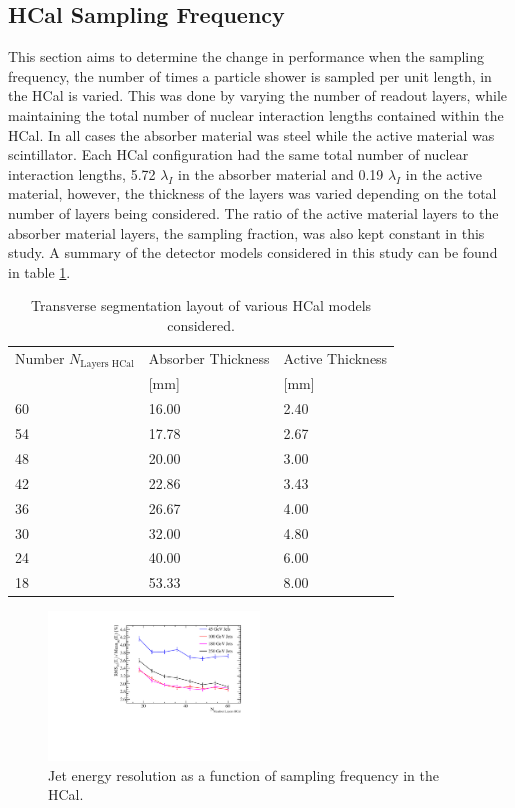 \subsection{HCal Sampling Frequency}
\label{sec:hcalsamplingfrequency}
This section aims to determine the change in performance when the sampling frequency, the number of times a particle shower is sampled per unit length, in the HCal is varied.  This was done by varying the number of readout layers, while maintaining the total number of nuclear interaction lengths contained within the HCal.  In all cases the absorber material was steel while the active material was scintillator.  Each HCal configuration had the same total number of nuclear interaction lengths, 5.72 $\lambda_{I}$ in the absorber material and 0.19 $\lambda_{I}$ in the active material, however, the thickness of the layers was varied depending on the total number of layers being considered.  The ratio of the active material layers to the absorber material layers, the sampling fraction, was also kept constant in this study.  A summary of the detector models considered in this study can be found in table \ref{table:nlayershcaloption}.  

\begin{table}[h!]
\centering
\begin{tabular}{ l l l }
\hline
Number $N_{\text{Layers HCal}}$& Absorber Thickness & Active Thickness \\
 & [mm] & [mm] \\
\hline
60 & 16.00 & 2.40 \\ 
54 & 17.78 & 2.67 \\
48 & 20.00 & 3.00 \\
42 & 22.86 & 3.43 \\
36 & 26.67 & 4.00 \\
30 & 32.00 & 4.80 \\
24 & 40.00 & 6.00 \\
18 & 53.33 & 8.00 \\
\hline
\end{tabular}
\caption[Transverse segmentation layout of various HCal models considered.]{Transverse segmentation layout of various HCal models considered.}
\label{table:nlayershcaloption}
\end{table}

\begin{figure}
\centering
\includegraphics[width=0.5\textwidth]{OptimisationStudies/Plots/JetEnergyResolutions/JER_vs_NumberOfLayersInTheHCal.pdf}
\caption[Jet energy resolution as a function of sampling frequency in the HCal.]{Jet energy resolution as a function of sampling frequency in the HCal.}
\label{fig:hcalnlayers}
\end{figure}


